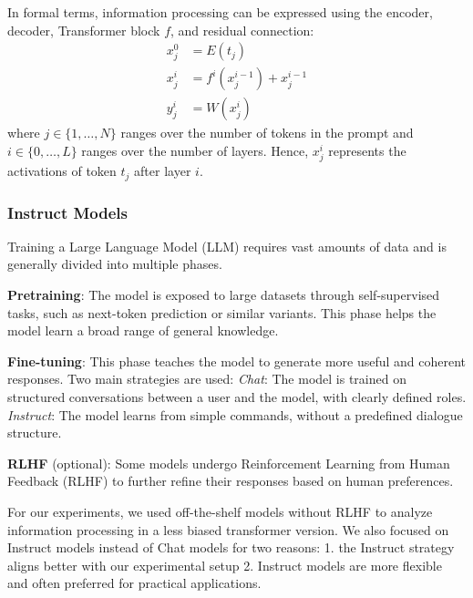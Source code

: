 In formal terms, information processing can be expressed using the encoder, decoder, Transformer block $f$, and residual connection:
\begin{align}
    x_j^0 & = E(t_j)\\
    x_j^i &  = f^i(x_j^{i-1}) + x_j^{i-1}  \\
    y_j^{i} &  = W(x_j^i) 
\end{align}
where $j\in\{1,\dots, N\}$ ranges over the number of tokens in the prompt and $i\in\{0,\dots,L\}$ ranges over the number of layers. Hence, $x_j^i$ represents the activations of token $t_j$ after layer $i$. 


\subsubsection{Instruct Models}
Training a Large Language Model (LLM) requires vast amounts of data and is generally divided into multiple phases. 

\textbf{Pretraining}: The model is exposed to large datasets through self-supervised tasks, such as next-token prediction or similar variants. This phase helps the model learn a broad range of general knowledge.

\textbf{Fine-tuning}: This phase teaches the model to generate more useful and coherent responses. Two main strategies are used:
\textit{Chat}: The model is trained on structured conversations between a user and the model, with clearly defined roles.
\textit{Instruct}: The model learns from simple commands, without a predefined dialogue structure.

\textbf{RLHF} (optional): Some models undergo Reinforcement Learning from Human Feedback (RLHF) to further refine their responses based on human preferences.

For our experiments, we used off-the-shelf models without RLHF to analyze information processing in a less biased transformer version. We also focused on Instruct models instead of Chat models for two reasons: 1. the Instruct strategy aligns better with our experimental setup 2.
Instruct models are more flexible and often preferred for practical applications.